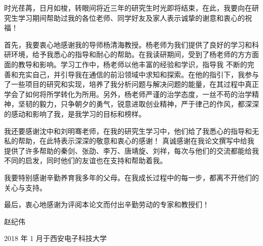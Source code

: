 
\begin{thanks}

时光荏苒，日月如梭，转眼间将近三年的研究生时光即将结束，在此，我要向在研究生学习期间帮助过我的各位老师、同学好友及家人表示诚挚的谢意和衷心的祝福！ \par

首先，我要衷心地感谢我的导师杨清海教授。杨老师为我们提供了良好的学习和科研环境，给予我悉心的指导和耐心的帮助。在我读研期间，受到了杨老师的方方面面的教导和影响。学习工作中，杨老师以他丰富的经验和学识，指导我
不断的完善和充实自己，并引导我在通信的前沿领域中求知和探索。在他的指引下，我参与了一些项目的研究和实现，培养了我分析问题与解决问题的能量，在其过程中真正学会了如何将所学转化为所用。另外，杨老师严谨的治学态度，一丝不苟的治学精神，坚韧的毅力，只争朝夕的勇气，锐意进取创业精神，严于律己的作风，都深深的感动和影响了我，是我学习的目标和榜样。 \par

我还要感谢沈中和刘明骞老师，在我的研究生学习中，他们给了我悉心的指导和无私的帮助，在此特表示深深的敬意和衷心的感谢！ 真诚感谢在我论文撰写中给我提供了许多帮助的秦剑、张劭、李万、唐靖旋、刘祥，每次与他们的交流都能给我不同的启发，同时他们的友谊也在支持和帮助着我。 \par

我要特别感谢辛勤养育我多年的父母。在我成长过程中的每一步，都离不开他们的关心与支持。 \par

最后，衷心地感谢为评阅本论文而付出辛勤劳动的专家和教授们！ \par

赵纪伟\par

2018 年 1 月于西安电子科技大学\par

\end{thanks}
